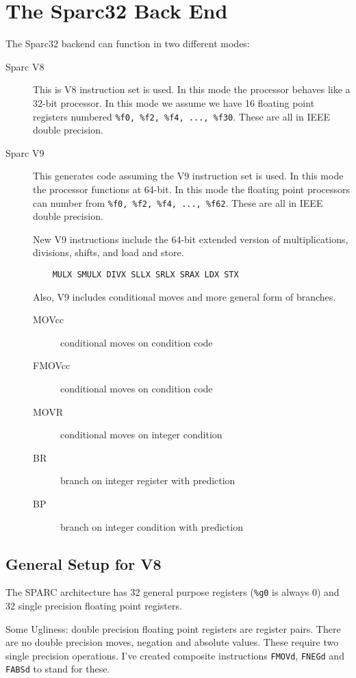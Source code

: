 \section{The Sparc32 Back End}

The Sparc32 backend can function in two different modes:
\begin{description}
  \item[Sparc V8]  This is V8 instruction set is used.  In this mode the processor
behaves like a 32-bit processor.   In this mode we assume we
have 16 floating point registers numbered \verb|%f0, %f2, %f4, ..., %f30|.
These are all in IEEE double precision.
  \item[Sparc V9]  This generates code assuming the V9 instruction set is used.
In this mode the processor functions at 64-bit.  In this mode the 
floating point processors can number from \verb|%f0, %f2, %f4, ..., %f62|.
These are all in IEEE double precision.

  New V9 instructions include the 64-bit extended version of multiplications,
divisions, shifts, and load and store.
\begin{verbatim}
    MULX SMULX DIVX SLLX SRLX SRAX LDX STX
\end{verbatim}

  Also, V9 includes conditional moves and more general form of branches.
\begin{description}
  \item[MOVcc]  conditional moves on condition code 
  \item[FMOVcc] conditional moves on condition code 
  \item[MOVR]   conditional moves on integer condition 
  \item[BR]     branch on integer register with prediction 
  \item[BP]     branch on integer condition with prediction 
\end{description}
\end{description}

\subsection{General Setup for V8}

 The SPARC architecture has 32 general purpose registers 
 (\verb|%g0| is always 0)
 and 32 single precision floating point registers.

 Some Ugliness: double precision floating point registers are
 register pairs.  There are no double precision moves, negation and absolute
 values.  These require two single precision operations.  I've created
 composite instructions \verb|FMOVd|, 
  \verb|FNEGd| and 
  \verb|FABSd| to stand for these.
 
